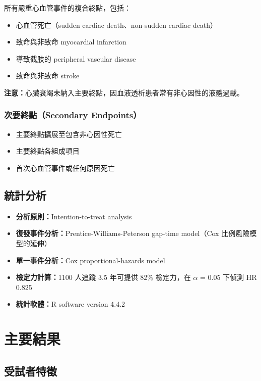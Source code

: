 \documentclass[12pt,a4paper]{article}
\begin{document}
所有嚴重心血管事件的複合終點，包括：
\begin{itemize}
    \item 心血管死亡（sudden cardiac death、non-sudden cardiac death）
    \item 致命與非致命 myocardial infarction
    \item 導致截肢的 peripheral vascular disease
    \item 致命與非致命 stroke
\end{itemize}

\textbf{注意：}心臟衰竭未納入主要終點，因血液透析患者常有非心因性的液體過載。

\subsubsection{次要終點（Secondary Endpoints）}

\begin{itemize}
    \item 主要終點擴展至包含非心因性死亡
    \item 主要終點各組成項目
    \item 首次心血管事件或任何原因死亡
\end{itemize}

\subsection{統計分析}

\begin{itemize}
    \item \textbf{分析原則：}Intention-to-treat analysis
    \item \textbf{復發事件分析：}Prentice-Williams-Peterson gap-time model（Cox 比例風險模型的延伸）
    \item \textbf{單一事件分析：}Cox proportional-hazards model
    \item \textbf{檢定力計算：}1100 人追蹤 3.5 年可提供 82\% 檢定力，在 $\alpha$ = 0.05 下偵測 HR 0.825
    \item \textbf{統計軟體：}R software version 4.4.2
\end{itemize}

\section{主要結果}

\subsection{受試者特徵}
\end{document}
